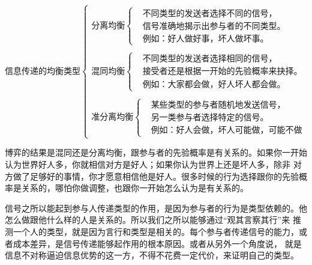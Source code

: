 \documentclass[12pt, a4paper]{article} %
\begin{document}
\begin{CJK*}{UTF8}{gbsn}
    \[
        \text{信息传递的均衡类型}
        \begin{cases}
             \text{分离均衡}\left\{
                \begin{aligned}
                    &\text{不同类型的发送者选择不同的信号，} \\
                    &\text{信号准确地揭示出参与者的不同类型。} \\
                    &\text{例如：好人做好事，坏人做坏事。}
                \end{aligned}
             \right. \\\\
             \text{混同均衡}\left\{
                \begin{aligned}
                    &\text{不同类型的发送者选择相同的信号，} \\
                    &\text{接受者还是根据一开始的先验概率来抉择。} \\
                    &\text{例如：大家都会做，好人坏人都会做。}
                \end{aligned}
             \right. \\\\
             \text{准分离均衡}\left\{
                \begin{aligned}
                    &\text{某些类型的参与者随机地发送信号，}  \\
                    &\text{另一类参与者选择特定的信号。} \\
                    &\text{例如：好人会做，坏人可能做，可能不做}
                \end{aligned}
             \right.
        \end{cases}
    \]

    博弈的结果是混同还是分离均衡，跟参与者的先验概率是有关系的。如果你一开始认为世界好人多，你就相信对方是好人；如果你认为世界上还是坏人多，除非
    对方做了足够好的事情，你才愿意相信他是好人。很多时候的行为选择跟你的先验概率是关系的，哪怕你做调整，也跟你一开始怎么认为是有关系的。\par

    信号之所以能起到参与人传递类型的作用，是因为参与者的行为是类型依赖的。他怎么做跟他什么样的人是关系的。所以我们之所以能够通过“观其言察其行”来
    推测一个人的类型，就是因为言行和类型是相关的。每个参与者传递信号的能力，或者成本差异，是信号传递能够起作用的根本原因。或者从另外一个角度说，
    就是信息不对称逼迫信息优势的这一方，不得不花费一定代价，来证明自己的类型。 \par

    \end{CJK*}
\end{document}
